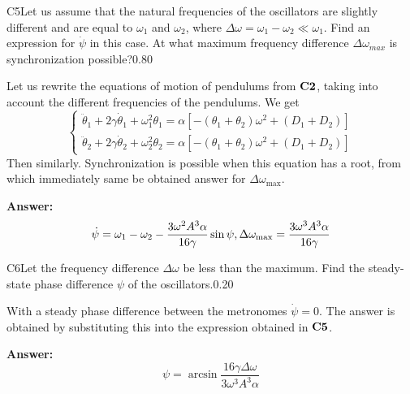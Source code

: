 \documentclass[11pt,a4paper]{article}
\begin{document}
\begin{solcard}{C5}{Let us assume that the natural frequencies of the oscillators are slightly different and are equal to $\omega_1$ and $\omega_2$, where $\Delta \omega = \omega_1 - \omega_2 \ll \omega_1$. Find an expression for $\dot{\psi}$ in this case. At what maximum frequency difference $\Delta \omega_{max}$ is synchronization possible?}{0.80}

Let us rewrite the equations of motion of pendulums from $\bf C2$, taking into account the different frequencies of the pendulums. We get $$ \begin{cases}\ddot{\theta}_1+2\gamma\dot{\theta}_1+\omega_1^2 \theta_1 = \alpha\left[-(\theta_1+\theta_2)\omega^2+(D_1+D_2)\right]\\\ddot{\theta}_2+2\gamma\dot{\theta}_2+\omega_2^2 \theta_2 = \alpha\left[-(\theta_1+\theta_2)\omega^2+(D_1+D_2)\right]\end{cases} $$Then similarly. Synchronization is possible when this equation has a root, from which immediately same be obtained answer for $\Delta\omega_{\max}$.

\par\smallskip\noindent\textbf{Answer:} \[\dot\psi=\omega_1-\omega_2-\frac{3\omega^2A^3\alpha}{16\gamma}\sin\psi,\\\Delta\omega_{\max}=\frac{3\omega^3A^3\alpha}{16\gamma}\]
\end{solcard}

\begin{solcard}{C6}{Let the frequency difference $\Delta \omega$ be less than the maximum. Find the steady-state phase difference $\psi$ of the oscillators.}{0.20}

With a steady phase difference between the metronomes $\dot\psi=0$. The answer is obtained by substituting this into the expression obtained in $\bf C5$.

\par\smallskip\noindent\textbf{Answer:} \[\psi=\arcsin\frac{16\gamma\Delta\omega}{3\omega^3A^3\alpha}\]
\end{solcard}
\end{document}

